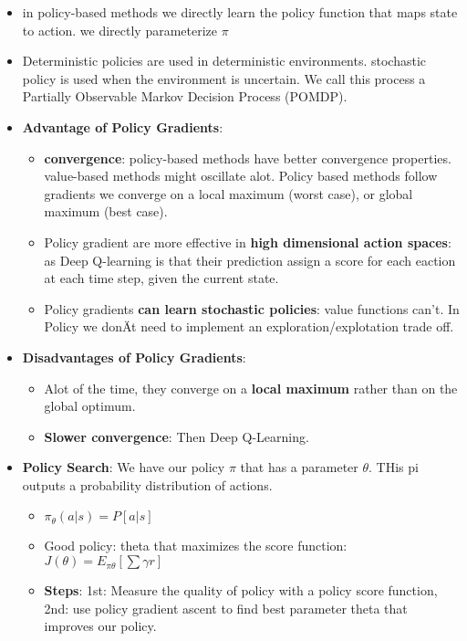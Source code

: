 \begin{itemize}[noitemsep,nolistsep]
	\item in policy-based methods we directly learn the policy function that maps state to action. we directly parameterize $\pi$
	\item Deterministic policies are used in deterministic environments. stochastic policy is used when the environment is uncertain. We call this process a Partially Observable Markov Decision Process (POMDP).
	\item \textbf{Advantage of Policy Gradients}:
	\begin{itemize}[noitemsep,nolistsep]
		\item \textbf{convergence}: policy-based methods have better convergence properties. value-based methods might oscillate alot. Policy based methods follow gradients we converge on a local maximum (worst case), or global maximum (best case).
		\item Policy gradient are more effective in \textbf{high dimensional action spaces}: as Deep Q-learning is that their prediction assign a score for each eaction at each time step, given the current state.
		\item Policy gradients \textbf{can learn stochastic policies}: value functions can't. In Policy we donÄt need to implement an exploration/explotation trade off. 
	\end{itemize}
	\item \textbf{Disadvantages of Policy Gradients}:
	\begin{itemize}[noitemsep,nolistsep]
		\item Alot of the time, they converge on a \textbf{local maximum} rather than on the global optimum.
		\item \textbf{Slower convergence}: Then Deep Q-Learning.
	\end{itemize}
	\item \textbf{Policy Search}: We have our policy $\pi$ that has a parameter $\theta$. THis pi outputs a probability distribution of actions.
	\begin{itemize}[noitemsep,nolistsep]
		\item $\pi_\theta (a|s) = P[a|s]$
		\item Good policy: theta that maximizes the score function: $J(\theta) = E_{\pi \theta} [\sum \gamma r]$
		\item \textbf{Steps}: 1st: Measure the quality of policy with a policy score function, 2nd: use policy gradient ascent to find best parameter theta that improves our policy.

\end{itemize}
\end{itemize}

